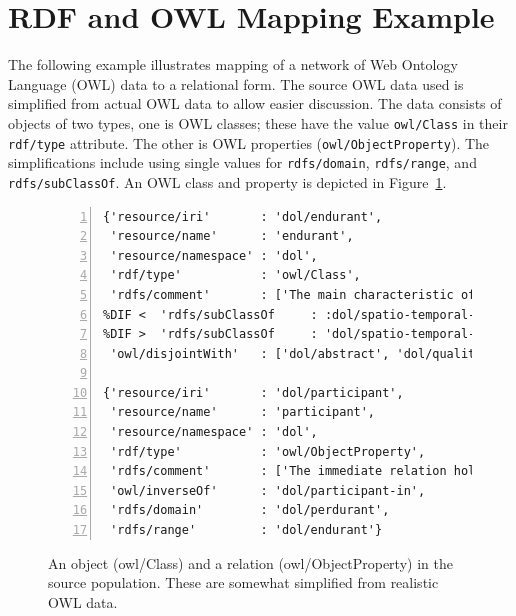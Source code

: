\documentclass[10pt,letterpaper]{article} %
\newcommand{\stt}[1]{\texttt{#1}} %
\providecommand{\DIFmodbegin}{} %
\providecommand{\DIFmodend}{} %
\begin{document}
\section{RDF and OWL Mapping Example}

The following example illustrates mapping of a network of Web Ontology Language (OWL) data to a relational form.
The source OWL data used is simplified from actual OWL data to allow easier discussion.
The data consists of objects of two types, one is OWL classes; these have the value  \stt{owl/Class} in their \stt{rdf/type} attribute.
The other is OWL properties (\stt{owl/ObjectProperty}).
The simplifications include using single values for \stt{rdfs/domain}, \stt{rdfs/range}, and \stt{rdfs/subClassOf}.
An OWL class and property is depicted in Figure~\ref{code:endurant}.

\begin{figure}[H]
  \caption{An object (owl/Class) and a relation (owl/ObjectProperty) in the source population.
    These are somewhat simplified from realistic OWL data.}
  \label{code:endurant}
\DIFmodbegin
\begin{lstlisting}[numberstyle=\scriptsize,basicstyle=\ttfamily\scriptsize,numbers=left,stepnumber=1,breaklines=true,alsolanguage=DIFcode]
{'resource/iri'       : 'dol/endurant',
 'resource/name'      : 'endurant',
 'resource/namespace' : 'dol',
 'rdf/type'           : 'owl/Class',
 'rdfs/comment'       : ['The main characteristic of endurants is...'],
%DIF <  'rdfs/subClassOf     : :dol/spatio-temporal-particular,
%DIF >  'rdfs/subClassOf     : 'dol/spatio-temporal-particular',
 'owl/disjointWith'   : ['dol/abstract', 'dol/quality', 'dol/perdurant']}

{'resource/iri'       : 'dol/participant',
 'resource/name'      : 'participant',
 'resource/namespace' : 'dol',
 'rdf/type'           : 'owl/ObjectProperty',
 'rdfs/comment'       : ['The immediate relation holding between endurants and perdurants...'],
 'owl/inverseOf'      : 'dol/participant-in',
 'rdfs/domain'        : 'dol/perdurant',
 'rdfs/range'         : 'dol/endurant'}
\end{lstlisting}
\DIFmodend
\end{figure} \vspace{-3em}
\end{document}
